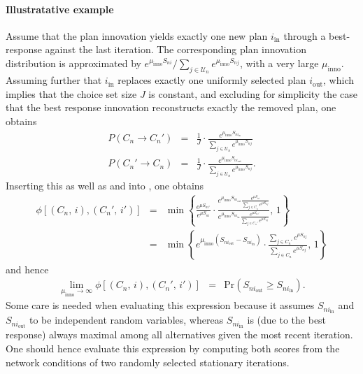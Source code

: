 \paragraph*{Illustratative example}
Assume that the plan innovation yields exactly
one new plan $i_{\text{in}}$ through a best-response
%
%
against the
last iteration. The corresponding plan innovation distribution is
approximated by $e^{\mu_{\text{inno}}S_{ni}}/\sum_{j\in \mathcal{U}_n}e^{\mu_{\text{inno}}S_{nj}}$,
with a very large $\mu_{\text{inno}}$. Assuming further that $i_{\text{in}}$
replaces exactly one uniformly selected plan $i_{\text{out}}$, 
which implies that the choice set size $J$ is constant, 
and excluding for simplicity the case that the best response innovation
reconstructs exactly the removed plan,
one obtains
\begin{eqnarray}
P(C_{n}\rightarrow C_{n}') & = & \frac{1}{J}\cdot\frac{e^{\mu_{\text{inno}}S_{ni_{\text{in}}}}}{\sum_{j\in \mathcal{U}_n}e^{\mu_{\text{inno}}S_{nj}}}\\
P(C_{n}'\rightarrow C_{n}) & = & \frac{1}{J}\cdot\frac{e^{\mu_{\text{inno}}S_{ni_{\text{out}}}}}{\sum_{j\in \mathcal{U}_n}e^{\mu_{\text{inno}}S_{nj}}}.
\end{eqnarray}
Inserting this as well as  and 
into , one obtains
\begin{eqnarray}
\phi[(C_{n},\, i),(C_{n}',\, i')] & = & 
\min\left\{ 
\frac{e^{\mu S_{ni'}}}{e^{\mu S_{ni}}}\cdot
\frac{{\displaystyle e^{\mu_{\text{inno}}S_{ni_{\text{out}}}}\frac{\displaystyle e^{\mu S_{ni}}}{\sum_{j\in C_{n}}\displaystyle e^{\mu S_{nj}}}}}
{{\displaystyle e^{\mu_{\text{inno}}S_{ni_{\text{in}}}}\frac{\displaystyle e^{\mu S_{ni'}}}{\sum_{j\in C_{n}'} \displaystyle e^{\mu S_{nj}}}}},\,1\right\} \\
 & = & 
 \min\left\{ 
 {\displaystyle e^{\mu_{\text{inno}}(S_{ni_{\text{out}}}-S_{ni_{\text{in}}})}} \cdot
 \frac{\sum_{j\in C_{n}'} \displaystyle e^{\mu S_{nj}}}{\sum_{j\in C_{n}} \displaystyle e^{\mu S_{nj}}},\,1\right\} 
\end{eqnarray}
and hence
\begin{eqnarray}
\lim_{\mu_{\text{inno}}\rightarrow\infty}
\phi[(C_{n},\, i),(C_{n}',\, i')] & = & \text{Pr}(S_{ni_{\text{out}}}\geq S_{ni_{\text{in}}}).
\end{eqnarray}
Some care is needed when evaluating this expression because it assumes
$S_{ni_{\text{in}}}$ and $S_{ni_{\text{out}}}$ to be independent
random variables, whereas $S_{ni_{\text{in}}}$ is (due to the best
response) always maximal among all alternatives given the most recent
iteration. One should hence evaluate this expression by computing
both scores from the network conditions of two
%
%
randomly selected stationary
iterations.

